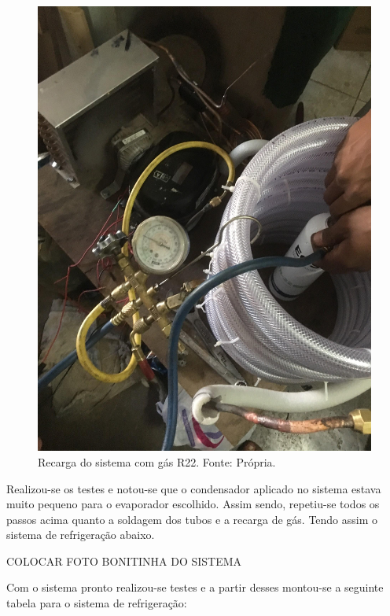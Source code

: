                         \begin{figure}[!htb]
                            \centering
                            \includegraphics[scale= 0.2]{figuras/recarga-gas.png}
                            \caption{Recarga do sistema com gás R22. Fonte: Própria.}
                            \label{recarga-gas}
                        \end{figure}

                        Realizou-se os testes e notou-se que o condensador aplicado no sistema estava muito
                        pequeno para o evaporador escolhido. Assim sendo, repetiu-se todos os passos
                        acima quanto a soldagem dos tubos e a recarga de gás. Tendo assim o sistema de
                        refrigeração abaixo. 

                        COLOCAR FOTO BONITINHA DO SISTEMA 

                        Com o sistema pronto realizou-se testes e a partir desses montou-se a seguinte tabela
                        para o sistema de refrigeração: 

